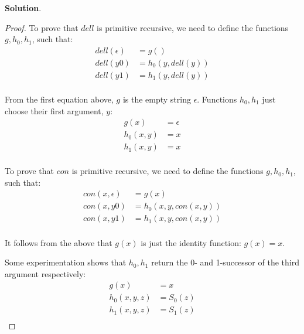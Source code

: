 \documentclass[11pt]{book}
\theoremstyle{definition}
\theoremstyle{plain}
\theoremstyle{problemstyle}
\theoremstyle{remark}
\theoremstyle{definition}
\begin{document}
\textbf{Solution}.
\begin{proof}
    To prove that $dell$ is primitive recursive, we need to define the functions $g,h_0,h_1$, such that:
    \begin{equation}
        \label{eq:dell-1}
        \begin{aligned}
            dell(\epsilon) &= g()\\
            dell(y0) &= h_0(y,dell(y))\\
            dell(y1) &= h_1(y,dell(y))\\
        \end{aligned}
    \end{equation}

    From the first equation above, $g$ is the empty string $\epsilon$. Functions $h_0,h_1$ just choose their first argument, $y$:
    \begin{equation}
        \label{eq:dell-2}
        \begin{aligned}
            g(x) &= \epsilon\\
            h_0(x,y) &= x\\
            h_1(x,y) &= x\\
        \end{aligned}
    \end{equation}

    To prove that $con$ is primitive recursive, we need to define the functions $g,h_0,h_1$, such that:
    \begin{equation}
        \label{eq:con-1}
        \begin{aligned}
            con(x,\epsilon) &= g(x)\\
            con(x,y0) &= h_0(x,y,con(x,y))\\
            con(x,y1) &= h_1(x,y,con(x,y))\\
        \end{aligned}
    \end{equation}

    It follows from the above that $g(x)$ is just the identity function: $g(x)=x$.

    Some experimentation shows that $h_0, h_1$ return the 0- and 1-successor of the third argument respectively:
    \begin{equation}
        \label{eq:con-2}
        \begin{aligned}
            g(x) &= x\\
            h_0(x,y,z) &= S_0(z)\\
            h_1(x,y,z) &= S_1(z)\\
        \end{aligned}
    \end{equation}
\end{proof}
\end{document}
